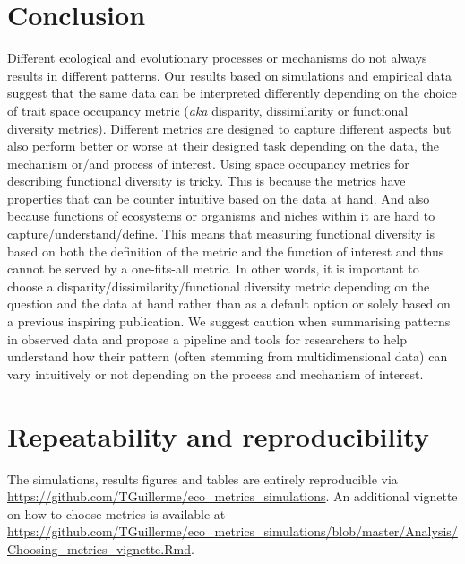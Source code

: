 \documentclass[12pt,letterpaper]{article}
\begin{document}
\section{Conclusion}
Different ecological and evolutionary processes or mechanisms do not always results in different patterns.
Our results based on simulations and empirical data suggest that the same data can be interpreted differently depending on the choice of trait space occupancy metric (\textit{aka} disparity, dissimilarity or functional diversity metrics).
Different metrics are designed to capture different aspects \citep{guillerme2020shifting,mammola2021concepts} but also perform better or worse at their designed task depending on the data, the mechanism or/and process of interest.
Using space occupancy metrics for describing functional diversity is tricky.
This is because the metrics have properties that can be counter intuitive based on the data at hand.
And also because functions of ecosystems or organisms and niches within it are hard to capture/understand/define.
This means that measuring functional diversity is based on both the definition of the metric and the function of interest and thus cannot be served by a one-fits-all metric.
In other words, it is important to choose a disparity/dissimilarity/functional diversity metric depending on the question and the data at hand rather than as a default option or solely based on a previous inspiring publication.
We suggest caution when summarising patterns in observed data and propose a pipeline and tools for researchers to help understand how their pattern (often stemming from multidimensional data) can vary intuitively or not depending on the process and mechanism of interest.

\section{Repeatability and reproducibility}
The simulations, results figures and tables are entirely reproducible via \url{https://github.com/TGuillerme/eco_metrics_simulations}.
An additional vignette on how to choose metrics is available at \url{https://github.com/TGuillerme/eco_metrics_simulations/blob/master/Analysis/Choosing_metrics_vignette.Rmd}.







\end{document}

